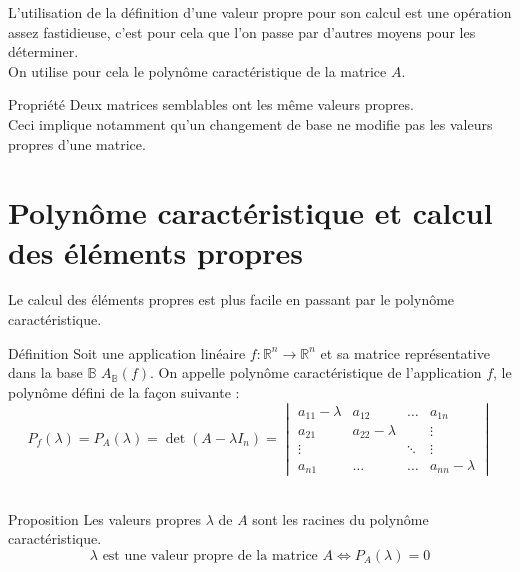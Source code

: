 L'utilisation de la définition d'une valeur propre pour son calcul est une opération assez fastidieuse, c'est pour cela que l'on passe par d'autres moyens pour les déterminer.\\
On utilise pour cela le polynôme caractéristique de la matrice $A$.
\begin{bclogo}[couleur=red!30,couleurBord=red,ombre=true,arrondi=0.1,logo=\bcoutil]{Propriété}
Deux matrices semblables ont les même valeurs propres.\\
Ceci implique notamment qu'un changement de base ne modifie pas les valeurs propres d'une matrice. 
\end{bclogo}
\section{Polynôme caractéristique et calcul des éléments propres}
Le calcul des éléments propres est plus facile en passant par le polynôme caractéristique.
\begin{bclogo}[couleur=blue!30,couleurBord=blue,arrondi=0.1,logo=\bcbook,ombre=true]{Définition}
Soit une application linéaire $f:\mathbb{R}^n\to\mathbb{R}^n$ et sa matrice représentative dans la base $\mathbb{B}$ $A_{\mathbb{B}}(f)$.
On appelle polynôme caractéristique de l'application $f$, le polynôme défini de la façon suivante :
$$P_{f}(\lambda)=P_{A}(\lambda)=\det(A-\lambda I_{n})=\begin{vmatrix}
a_{11}-\lambda & a_{12} & \hdots & a_{1n}\\
a_{21} & a_{22}-\lambda &&\vdots \\
\vdots & & \ddots & \vdots\\
a_{n1} &\hdots&\hdots& a_{nn}-\lambda
\end{vmatrix}$$
\\
\end{bclogo}

\begin{bclogo}[couleur=green!30,couleurBord=green,logo=\bccle ,ombre=true,arrondi=0.1]{Proposition}
Les valeurs propres $\lambda$ de $A$ sont les racines du polynôme caractéristique.
$$\lambda \text{ est une valeur propre de la matrice } A \Leftrightarrow P_A(\lambda) = 0$$
\end{bclogo}

